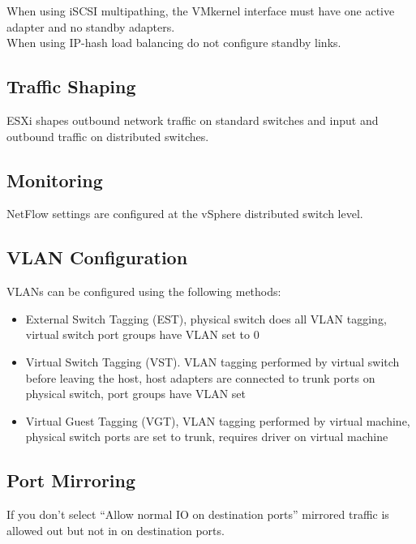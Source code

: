 \documentclass{article}
\begin{document}
When using iSCSI multipathing, the VMkernel interface must have one active
adapter and no standby adapters.\\

When using IP-hash load balancing do not configure standby links.

\subsection{Traffic Shaping}

ESXi shapes outbound network traffic on standard switches and input and
outbound traffic on distributed switches.

\subsection{Monitoring}

NetFlow settings are configured at the vSphere distributed switch level.

\subsection{VLAN Configuration}

VLANs can be configured using the following methods:

\begin{itemize}

\item External Switch Tagging (EST), physical switch does all VLAN tagging,
virtual switch port groups have VLAN set to 0

\item Virtual Switch Tagging (VST). VLAN tagging performed by virtual switch
before leaving the host, host adapters are connected to trunk ports on
physical switch, port groups have VLAN set

\item Virtual Guest Tagging (VGT), VLAN tagging performed by virtual machine,
physical switch ports are set to trunk, requires driver on virtual machine

\end{itemize}

\subsection{Port Mirroring}

If you don't select ``Allow normal IO on destination ports'' mirrored traffic
is allowed out but not in on destination ports.
\end{document}
